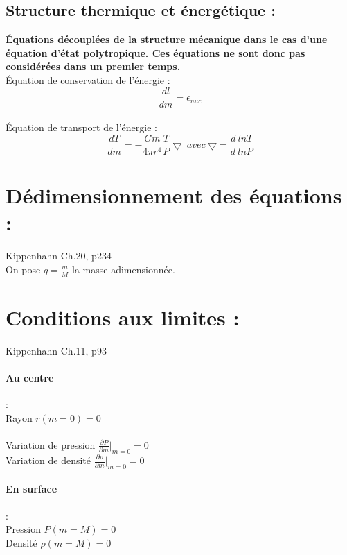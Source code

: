 \documentclass[a4paper,10pt]{article}
\begin{document}
\subsection{Structure thermique et énergétique :}
\textbf{Équations découplées de la structure mécanique dans le cas d'une équation d'état polytropique. Ces équations ne sont donc pas considérées dans un premier temps.}\\
Équation de conservation de l'énergie :
\begin{equation}
\frac{d l}{d m}= \epsilon_{nuc}
\end{equation}
\\
Équation de transport de l'énergie :
\begin{equation}
\frac{d T}{d m}= - \frac{G m}{4 \pi r^4} \frac{T}{P} \bigtriangledown ~ avec ~ \bigtriangledown = \frac{d~ln T}{d~ln P}
\end{equation}

\section{Dédimensionnement des équations :}
Kippenhahn Ch.20, p234\\
On pose $q=\frac{m}{M}$ la masse adimensionnée.\\

\newpage
\section{Conditions aux limites :}
Kippenhahn Ch.11, p93
\paragraph{Au centre}: \\
Rayon $r(m=0)=0$\\
\\
Variation de pression $\frac{\partial P}{\partial m}\vert_{m=0} = 0$\\
Variation de densité $\frac{\partial \rho}{\partial m}\vert_{m=0} = 0$\\

\paragraph{En surface}:\\
Pression $P(m=M)=0$\\
Densité $\rho(m=M)=0$\\
\end{document}
